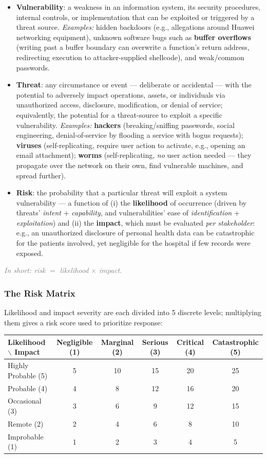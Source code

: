 \documentclass[12pt, a4paper]{article}
\begin{document}
\begin{itemize}
    \item \textbf{Vulnerability}: a weakness in an information system, its security procedures, internal controls, or implementation that can be exploited or triggered by a threat source. \emph{Examples:} hidden backdoors (e.g., allegations around Huawei networking equipment), unknown software bugs such as \textbf{buffer overflows} (writing past a buffer boundary can overwrite a function's return address, redirecting execution to attacker-supplied shellcode), and weak/common passwords.
    \item \textbf{Threat}: any circumstance or event — deliberate or accidental — with the potential to adversely impact operations, assets, or individuals via unauthorized access, disclosure, modification, or denial of service; equivalently, the potential for a threat-source to exploit a specific vulnerability. \emph{Examples:} \textbf{hackers} (breaking/sniffing passwords, social engineering, denial-of-service by flooding a service with bogus requests); \textbf{viruses} (self-replicating, require user action to activate, e.g., opening an email attachment); \textbf{worms} (self-replicating, \emph{no} user action needed — they propagate over the network on their own, find vulnerable machines, and spread further).
    \item \textbf{Risk}: the probability that a particular threat will exploit a system vulnerability — a function of (i) the \textbf{likelihood} of occurrence (driven by threats' \emph{intent} + \emph{capability}, and vulnerabilities' ease of \emph{identification} + \emph{exploitation}) and (ii) the \textbf{impact}, which must be evaluated \emph{per stakeholder}: e.g., an unauthorized disclosure of personal health data can be catastrophic for the patients involved, yet negligible for the hospital if few records were exposed.
\end{itemize}

\textcolor{gray}{\textit{In short: risk } $=$ \textit{likelihood} $\times$ \textit{impact.}}

\subsubsection{The Risk Matrix}
Likelihood and impact severity are each divided into 5 discrete levels; multiplying them gives a risk score used to prioritize response:

\begin{center}
\begin{tabular}{@{}l|ccccc@{}}
\toprule
\textbf{Likelihood} $\backslash$ \textbf{Impact} & Negligible (1) & Marginal (2) & Serious (3) & Critical (4) & Catastrophic (5) \\
\midrule
Highly Probable (5) & 5 & 10 & 15 & 20 & 25 \\
Probable (4) & 4 & 8 & 12 & 16 & 20 \\
Occasional (3) & 3 & 6 & 9 & 12 & 15 \\
Remote (2) & 2 & 4 & 6 & 8 & 10 \\
Improbable (1) & 1 & 2 & 3 & 4 & 5 \\
\bottomrule
\end{tabular}
\end{center}
\end{document}
